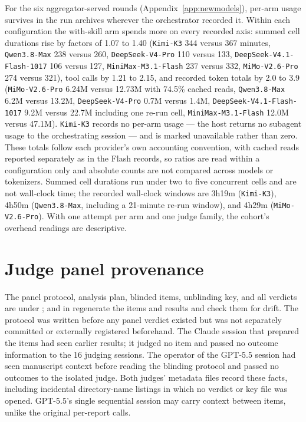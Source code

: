 \documentclass[11pt]{article}
\begin{document}
For the six aggregator-served rounds (Appendix~\ref{app:newmodels}), per-arm usage survives in the run archives wherever the orchestrator recorded it. Within each configuration the with-skill arm spends more on every recorded axis: summed cell durations rise by factors of 1.07 to 1.40 (\texttt{Kimi-K3} 344 versus 367 minutes, \texttt{Qwen3.8-Max} 238 versus 260, \texttt{DeepSeek-V4-Pro} 110 versus 133, \texttt{DeepSeek-V4.1-Flash-1017} 106 versus 127, \texttt{MiniMax-M3.1-Flash} 237 versus 332, \texttt{MiMo-V2.6-Pro} 274 versus 321), tool calls by 1.21 to 2.15, and recorded token totals by 2.0 to 3.9 (\texttt{MiMo-V2.6-Pro} 6.24M versus 12.73M with 74.5\% cached reads, \texttt{Qwen3.8-Max} 6.2M versus 13.2M, \texttt{DeepSeek-V4-Pro} 0.7M versus 1.4M, \texttt{DeepSeek-V4.1-Flash-1017} 9.2M versus 22.7M including one re-run cell, \texttt{MiniMax-M3.1-Flash} 12.0M versus 47.1M). \texttt{Kimi-K3} records no per-arm usage --- the host returns no subagent usage to the orchestrating session --- and is marked unavailable rather than zero. These totals follow each provider's own accounting convention, with cached reads reported separately as in the Flash records, so ratios are read within a configuration only and absolute counts are not compared across models or tokenizers. Summed cell durations run under two to five concurrent cells and are not wall-clock time; the recorded wall-clock windows are 3h19m (\texttt{Kimi-K3}), 4h50m (\texttt{Qwen3.8-Max}, including a 21-minute re-run window), and 4h29m (\texttt{MiMo-V2.6-Pro}). With one attempt per arm and one judge family, the cohort's overhead readings are descriptive.

\section{Judge panel provenance}\label{app:panel}
The panel protocol, analysis plan, blinded items, unblinding key, and all verdicts are under ;  and  in  regenerate the items and results and check them for drift. The protocol was written before any panel verdict existed but was not separately committed or externally registered beforehand. The Claude session that prepared the items had seen earlier results; it judged no item and passed no outcome information to the 16 judging sessions. The operator of the GPT-5.5 session had seen manuscript context before reading the blinding protocol and passed no outcomes to the isolated judge. Both judges' metadata files record these facts, including incidental directory-name listings in which no verdict or key file was opened. GPT-5.5's single sequential session may carry context between items, unlike the original per-report calls.
\end{document}
